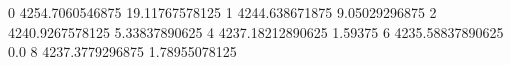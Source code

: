 0 4254.7060546875 19.11767578125
1 4244.638671875 9.05029296875
2 4240.9267578125 5.33837890625
4 4237.18212890625 1.59375
6 4235.58837890625 0.0
8 4237.3779296875 1.78955078125
